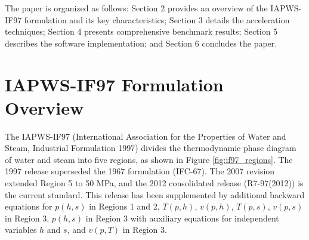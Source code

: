 \documentclass{article}
\begin{document}
The paper is organized as follows: Section 2 provides an overview of the IAPWS-IF97 formulation and its key characteristics; Section 3 details the acceleration techniques; Section 4 presents comprehensive benchmark results; Section 5 describes the software implementation; and Section 6 concludes the paper.

\section{IAPWS-IF97 Formulation Overview}

The IAPWS-IF97 (International Association for the Properties of Water and Steam, Industrial Formulation 1997) \cite{IAPWS-IF97} divides the thermodynamic phase diagram of water and steam into five regions, as shown in Figure \ref{fig:if97_regions}. The 1997 release superseded the 1967 formulation (IFC-67). The 2007 revision extended Region 5 to 50 MPa, and the 2012 consolidated release (R7-97(2012)) is the current standard. This release has been supplemented by additional backward equations for $p(h,s)$ in Regions 1 and 2, $T(p,h)$, $v(p,h)$, $T(p,s)$, $v(p,s)$ in Region 3, $p(h,s)$ in Region 3 with auxiliary equations for independent variables $h$ and $s$, and $v(p,T)$ in Region 3.
\end{document}
